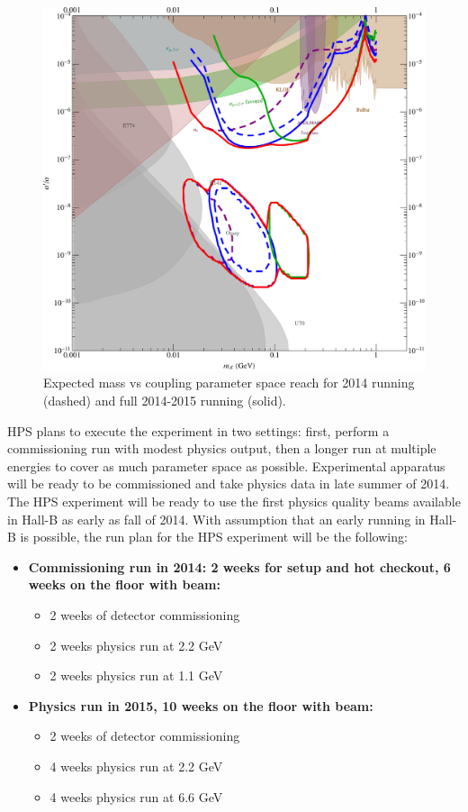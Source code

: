 \begin{figure}
\includegraphics[width=\textwidth]{measurements/HPS-Proposal2014-Reach.pdf}
\caption{Expected mass vs coupling parameter space reach for 2014 running (dashed) and full 2014-2015 running (solid).}
\label{fig:reach}
\end{figure}

HPS plans to execute the experiment in two settings: first, perform a commissioning run with modest physics output, then a longer run at multiple energies to cover as much parameter space as possible. Experimental apparatus will be ready to be commissioned and take physics data in late summer of 2014. The HPS experiment will be ready to use the first physics quality beams available in Hall-B as early as fall of 2014. With assumption that an early running in Hall-B is possible, the run plan for the HPS experiment will be the following: 

\begin{itemize}
\item {\bf Commissioning run in 2014: 2 weeks for setup and hot checkout, 6 weeks on the floor with beam:}
\begin{itemize}
\item 2 weeks of detector commissioning
\item 2 weeks physics run at 2.2 GeV
\item 2 weeks physics run at 1.1 GeV
\end{itemize}
\item{\bf Physics run in 2015, 10 weeks on the floor with beam:}
\begin{itemize}
\item 2 weeks of detector commissioning
\item 4 weeks physics run at 2.2 GeV
\item 4 weeks physics run at 6.6 GeV
\end{itemize}
\end{itemize}

